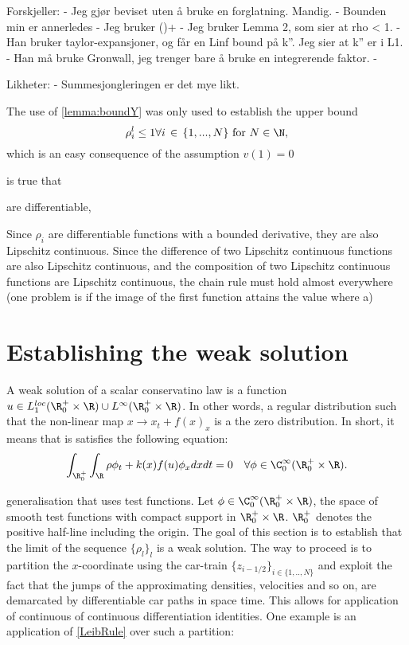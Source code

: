 Forskjeller: 
	- Jeg gjør beviset uten å bruke en forglatning. Mandig. 
	- Bounden min er annerledes 
	- Jeg bruker ()+
	- Jeg bruker Lemma 2, som sier at rho < 1. 
	- Han bruker taylor-expansjoner, og får en Linf bound på k''. Jeg sier at k'' er i L1. 
	- Han må bruke Gronwall, jeg trenger bare å bruke en integrerende faktor. 
	- 

Likheter: 
	- Summesjongleringen er det mye likt. 


\begin{Remark}
	The use of \eqref{lemma:boundY} was only used to establish the upper bound 
	\begin{equation}
		\rho^l_i \leq 1 \forall i \, \in \, \{1,...,N\} \text{ for } N \in \N,
	\end{equation} 
	which is an easy consequence of the assumption $v(1) = 0$
	
\end{Remark}
 is true that 

are differentiable,  


Since $\rho_i$ are differentiable functions with a bounded derivative, they are also Lipschitz continuous.  Since the difference of two Lipschitz continuous functions are also Lipschitz continuous, and the composition of two Lipschitz continuous functions are Lipschitz continuous, the chain rule must hold almost everywhere (one problem is if the image of the first function attains the value where a)






\section{Establishing the weak solution} \label{section:weak_sol}

A weak solution of a scalar conservatino law is a function $u \in L_1^{loc}(\R^+_0 \times \R) \cup L^\infty(\R^+_0 \times \R)$. In other words, a regular distribution such that the non-linear map $x \rightarrow x_t + f(x)_x$ is a the zero distribution. In short, it means that is satisfies the following equation:
\begin{equation} \label{space_dep_weak_s}
    \int_{\R_0^+}\int_{\R} \rho \phi_t + k(x) f(u) \phi_x dx dt = 0 \quad \forall \phi \in \C^\infty_0(\R^+_0 \times \R).
\end{equation}

generalisation that uses test functions. Let $\phi \in \C^\infty_0(\R^+_0 \times \R)$, the space of smooth test functions with compact support in  $\R^+_0\times\R$. $\R_0^+$ denotes the positive half-line including the origin. The goal of this section is to establish that the limit of the sequence $\{\rho_l\}_l$ is a weak solution. The way to proceed is to partition the $x$-coordinate using the car-train $\{z_{i-1/2}\}_{i \in \{1,..,N\}}$ and exploit the fact that the jumps of the approximating densities, velocities and so on,  are demarcated by differentiable car paths in space time. This allows for application of continuous of continuous differentiation identities. One example is an application of \eqref{LeibRule} over such a partition: 

